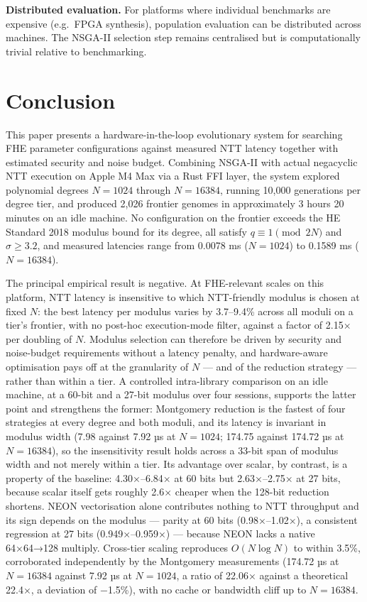 \textbf{Distributed evaluation.} For platforms where individual benchmarks are expensive (e.g.~FPGA synthesis), population evaluation can be distributed across machines. The NSGA-II selection step remains centralised but is computationally trivial relative to benchmarking.

\section{Conclusion}\label{conclusion}

This paper presents a hardware-in-the-loop evolutionary system for searching FHE parameter configurations against measured NTT latency together with estimated security and noise budget. Combining NSGA-II with actual negacyclic NTT execution on Apple M4 Max via a Rust FFI layer, the system explored polynomial degrees \(N = 1024\) through \(N = 16384\), running 10,000 generations per degree tier, and produced 2,026 frontier genomes in approximately 3 hours 20 minutes on an idle machine. No configuration on the frontier exceeds the HE Standard 2018 modulus bound for its degree, all satisfy \(q \equiv 1 \pmod{2N}\) and \(\sigma \geq 3.2\), and measured latencies range from 0.0078 ms (\(N = 1024\)) to 0.1589 ms (\(N = 16384\)).

The principal empirical result is negative. At FHE-relevant scales on this platform, NTT latency is insensitive to which NTT-friendly modulus is chosen at fixed \(N\): the best latency per modulus varies by 3.7--9.4\% across all moduli on a tier's frontier, with no post-hoc execution-mode filter, against a factor of 2.15× per doubling of \(N\). Modulus selection can therefore be driven by security and noise-budget requirements without a latency penalty, and hardware-aware optimisation pays off at the granularity of \(N\) --- and of the reduction strategy --- rather than within a tier. A controlled intra-library comparison on an idle machine, at a 60-bit and a 27-bit modulus over four sessions, supports the latter point and strengthens the former: Montgomery reduction is the fastest of four strategies at every degree and both moduli, and its latency is invariant in modulus width (7.98 against 7.92 µs at \(N = 1024\); 174.75 against 174.72 µs at \(N = 16384\)), so the insensitivity result holds across a 33-bit span of modulus width and not merely within a tier. Its advantage over scalar, by contrast, is a property of the baseline: 4.30×--6.84× at 60 bits but 2.63×--2.75× at 27 bits, because scalar itself gets roughly 2.6× cheaper when the 128-bit reduction shortens. NEON vectorisation alone contributes nothing to NTT throughput and its sign depends on the modulus --- parity at 60 bits (0.98×--1.02×), a consistent regression at 27 bits (0.949×--0.959×) --- because NEON lacks a native 64×64→128 multiply. Cross-tier scaling reproduces \(O(N \log N)\) to within 3.5\%, corroborated independently by the Montgomery measurements (174.72 µs at \(N = 16384\) against 7.92 µs at \(N = 1024\), a ratio of 22.06× against a theoretical 22.4×, a deviation of −1.5\%), with no cache or bandwidth cliff up to \(N = 16384\).

